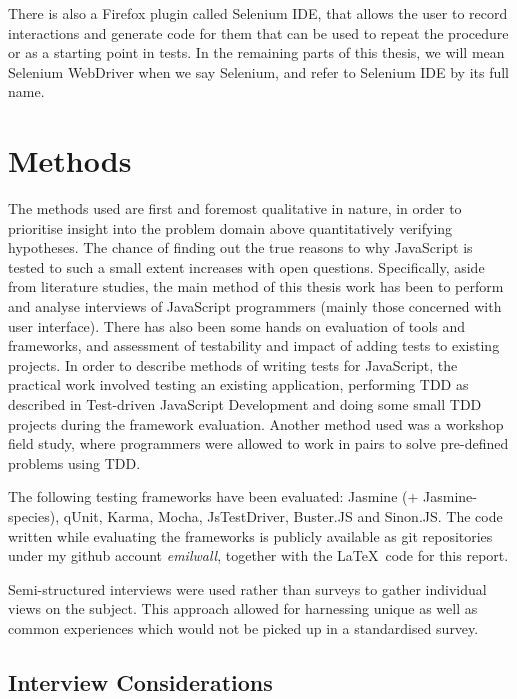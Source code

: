 \documentclass[11pt]{article}
\begin{document}
There is also a Firefox plugin called Selenium IDE, that allows the user to record interactions and generate code for them that can be used to repeat the procedure or as a starting point in tests. In the remaining parts of this thesis, we will mean Selenium WebDriver when we say Selenium, and refer to Selenium IDE by its full name.

\section{Methods}

The methods used are first and foremost qualitative in nature, in order to prioritise insight into the problem domain above quantitatively verifying hypotheses. The chance of finding out the true reasons to why JavaScript is tested to such a small extent increases with open questions. Specifically, aside from literature studies, the main method of this thesis work has been to perform and analyse interviews of JavaScript programmers (mainly those concerned with user interface). There has also been some hands on evaluation of tools and frameworks, and assessment of testability and impact of adding tests to existing projects. In order to describe methods of writing tests for JavaScript, the practical work involved testing an existing application, performing TDD as described in Test-driven JavaScript Development\cite{Tddjs} and doing some small TDD projects during the framework evaluation. Another method used was a workshop field study, where programmers were allowed to work in pairs to solve pre-defined problems using TDD.

The following testing frameworks have been evaluated: Jasmine\cite{JasmineSite} (+ Jasmine-species\cite{JasmineSpecies}), qUnit\cite{QUnitSite}, Karma\cite{KarmaSite}, Mocha\cite{MochaSite}, JsTestDriver\cite{JsTestDriver}, Buster.JS\cite{BusterJS} and Sinon.JS\cite{SinonJS}. The code written while evaluating the frameworks is publicly available as git repositories under my github account \emph{emilwall}, together with the \LaTeX~code for this report.

Semi-structured interviews were used rather than surveys to gather individual views on the subject. This approach allowed for harnessing unique as well as common experiences which would not be picked up in a standardised survey.

\subsection{Interview Considerations}
\end{document}
